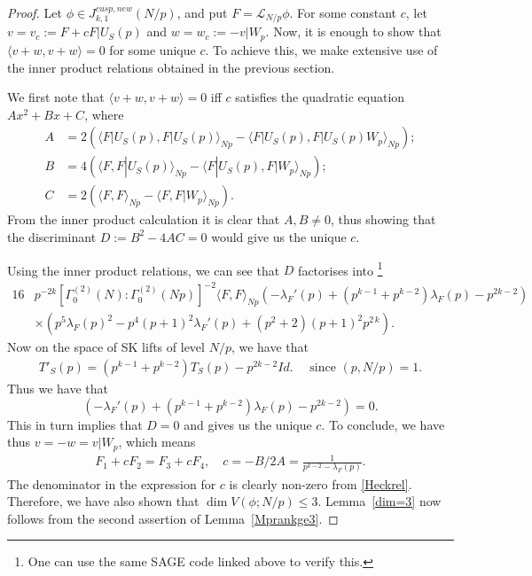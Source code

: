 \documentclass[11pt]{amsart}
\numberwithin{equation}{section}
\theoremstyle{plain}
\theoremstyle{definition}
\newcommand{\lemref}[1]{Lemma~\ref{#1}}
\newcommand{\mc}{\mathcal}
\newcommand{\lan}{\langle }
\newcommand{\ran}{\rangle}
\newcommand{\q}{\quad}
\begin{document}
\begin{proof}
Let $\phi \in J_{k,1}^{cusp,new}(N/p)$, and put $F= \mc L_{N/p} \phi$. For some constant $c$, let $v=v_c := F+c F|U_S(p)$ and $w=w_c:= -v|W_p$. Now, it is enough to show that $\lan v+w, v+w\ran =0$ for some unique $c$. To achieve this, we make extensive use of the inner product relations obtained in the previous section.

We first note that $\lan v+w, v+w\ran =0$ iff $c$ satisfies the quadratic equation $Ax^2+Bx+C$, where
\begin{equation}
\begin{split}
    A&=2\left(\lan F|U_S(p), F|U_S(p) \ran_{Np} -  \lan F|U_S(p), F|U_S(p)W_p \ran_{Np} \right);\\
    B&=4\left(\lan F, F|U_S(p)\ran_{Np} - \lan F|U_S(p), F|W_p \ran_{Np} \right);\\
    C&=2\left(\lan F, F \ran_{Np} - \lan F, F|W_p \ran_{Np} \right).
\end{split}
\end{equation}
From the inner product calculation it is clear that $A, B\neq 0$, thus showing that the discriminant $D:=B^2-4AC=0$ would give us the unique $c$.

Using the inner product relations, we can see that $D$ factorises into \footnote{One can use the same SAGE code linked above to verify this.}
\begin{equation}
\begin{split}
    16 &p^{-2k}[\Gamma_0^{(2)}(N):\Gamma_0^{(2)}(Np)]^{-2} \lan F, F\ran_{Np} \left( -\lambda_F'(p) + (p^{k -1}+ p^{k-2}) \lambda_F(p) - p^{2k-2}\right)\\
   & \times \left(p^{5} \lambda_F(p)^{2} - p^4(p+1)^2\lambda_F'(p) + \left(p^{2} + 2\right) {\left(p + 1\right)}^{2} p^{2 \, k}\right).
\end{split}
\end{equation}
Now on the space of SK lifts of level $N/p$, we have that 
\begin{align}\label{SKrelHecke}
    T'_S(p)= (p^{k-1}+p^{k-2})T_S(p) - p^{2k-2} Id.\q \text{ since } (p, N/p)=1.
\end{align}
Thus we have that
\begin{equation}
    \left( -\lambda_F'(p) + (p^{k -1}+ p^{k-2}) \lambda_F(p) - p^{2k-2}\right)=0.
\end{equation}
This in turn implies that $D=0$ and gives us the unique $c$. To conclude, we have thus $v=-w=v|W_p$,  which means
\begin{align} 
 \label{expl-reln} F_1+cF_2=F_3+cF_4, \q c = -B/2A= \frac{1}{p^{k-2}-\lambda_F(p)}.
\end{align}
The denominator in the expression for $c$ is clearly non-zero from \eqref{Heckrel}. Therefore, we have also shown that $\dim V(\phi;N/p)\le 3$. \lemref{dim=3} now follows from the second assertion of \lemref{Mprankge3}.
\end{proof}
\end{document}
